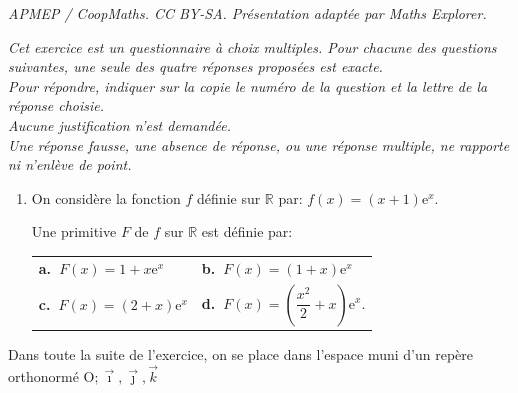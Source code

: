 \documentclass[10pt]{article}
\providecommand{\R}{\mathbb{R}}
\providecommand{\e}{{\mathrm{e}}}
\providecommand{\Oijk}{\(\mathrm{O};\vec{\imath},\vec{\jmath},\vec{k}\)}
\begin{document}
\noindent\textit{APMEP / CoopMaths. CC BY-SA. Présentation adaptée par Maths Explorer.}\par\medskip
\medskip

\emph{Cet exercice est un questionnaire à choix multiples. Pour chacune des questions suivantes, une seule des quatre réponses proposées est exacte. \\
Pour répondre, indiquer sur la copie le numéro de la question et la lettre de la réponse choisie. \\
Aucune justification n'est demandée. \\
Une réponse fausse, une absence de réponse, ou une réponse multiple, ne rapporte
ni n'enlève de point.}

\medskip

\begin{enumerate}
\item On considère la fonction $f$ définie sur $\R$ par: $f(x) = (x + 1)\text{e}^x$. 

Une primitive $F$ de $f$ sur $\R$ est définie par:
\begin{center}
\begin{tabularx}{\linewidth}{X X}
\textbf{a.~}$F(x) = 1+x\e^x$ &\textbf{b.~}$F(x) = (1+x)\e^x$\\
\textbf{c.~}$F(x) = (2 + x)\e^x$&\textbf{d.~}$F(x) = \left(\dfrac{x^2}{2}  + x\right)\e^x$.
\end{tabularx}
\end{center}
\end{enumerate}
Dans toute la suite de l'exercice, on se place dans l'espace muni d'un repère
orthonormé \Oijk
\end{document}
